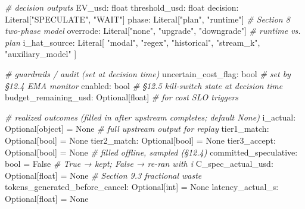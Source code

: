 \documentclass[
  11pt,
]{article}
\newenvironment{Shaded}{}{}
\newcommand{\BuiltInTok}[1]{\textcolor[rgb]{0.00,0.50,0.00}{#1}}
\newcommand{\CommentTok}[1]{\textcolor[rgb]{0.38,0.63,0.69}{\textit{#1}}}
\newcommand{\NormalTok}[1]{#1}
\newcommand{\OperatorTok}[1]{\textcolor[rgb]{0.40,0.40,0.40}{#1}}
\newcommand{\StringTok}[1]{\textcolor[rgb]{0.25,0.44,0.63}{#1}}
\newcommand{\VariableTok}[1]{\textcolor[rgb]{0.10,0.09,0.49}{#1}}
\newcounter{none} %
\begin{document}
\begin{Shaded}
\begin{Highlighting}[]
    \CommentTok{\# decision outputs}
\NormalTok{    EV\_usd: }\BuiltInTok{float}
\NormalTok{    threshold\_usd: }\BuiltInTok{float}
\NormalTok{    decision: Literal[}\StringTok{"SPECULATE"}\NormalTok{, }\StringTok{"WAIT"}\NormalTok{]}
\NormalTok{    phase: Literal[}\StringTok{"plan"}\NormalTok{, }\StringTok{"runtime"}\NormalTok{]      }\CommentTok{\# Section 8 two{-}phase model}
\NormalTok{    overrode: Literal[}\StringTok{"none"}\NormalTok{, }\StringTok{"upgrade"}\NormalTok{, }\StringTok{"downgrade"}\NormalTok{]  }\CommentTok{\# runtime vs. plan}
\NormalTok{    i\_hat\_source: Literal[}
        \StringTok{"modal"}\NormalTok{, }\StringTok{"regex"}\NormalTok{, }\StringTok{"historical"}\NormalTok{, }\StringTok{"stream\_k"}\NormalTok{, }\StringTok{"auxiliary\_model"}
\NormalTok{    ]}

    \CommentTok{\# guardrails / audit (set at decision time)}
\NormalTok{    uncertain\_cost\_flag: }\BuiltInTok{bool}              \CommentTok{\# set by §12.4 EMA monitor}
\NormalTok{    enabled: }\BuiltInTok{bool}                          \CommentTok{\# §12.5 kill{-}switch state at decision time}
\NormalTok{    budget\_remaining\_usd: Optional[}\BuiltInTok{float}\NormalTok{]  }\CommentTok{\# for cost SLO triggers}

    \CommentTok{\# realized outcomes (filled in after upstream completes; default None)}
\NormalTok{    i\_actual: Optional[}\BuiltInTok{object}\NormalTok{] }\OperatorTok{=} \VariableTok{None}      \CommentTok{\# full upstream output for replay}
\NormalTok{    tier1\_match: Optional[}\BuiltInTok{bool}\NormalTok{] }\OperatorTok{=} \VariableTok{None}
\NormalTok{    tier2\_match: Optional[}\BuiltInTok{bool}\NormalTok{] }\OperatorTok{=} \VariableTok{None}
\NormalTok{    tier3\_accept: Optional[}\BuiltInTok{bool}\NormalTok{] }\OperatorTok{=} \VariableTok{None}    \CommentTok{\# filled offline, sampled (§12.4)}
\NormalTok{    committed\_speculative: }\BuiltInTok{bool} \OperatorTok{=} \VariableTok{False}    \CommentTok{\# True → kept; False → re{-}ran with i}
\NormalTok{    C\_spec\_actual\_usd: Optional[}\BuiltInTok{float}\NormalTok{] }\OperatorTok{=} \VariableTok{None}  \CommentTok{\# Section 9.3 fractional waste}
\NormalTok{    tokens\_generated\_before\_cancel: Optional[}\BuiltInTok{int}\NormalTok{] }\OperatorTok{=} \VariableTok{None}
\NormalTok{    latency\_actual\_s: Optional[}\BuiltInTok{float}\NormalTok{] }\OperatorTok{=} \VariableTok{None}
\end{Highlighting}
\end{Shaded}
\end{document}
